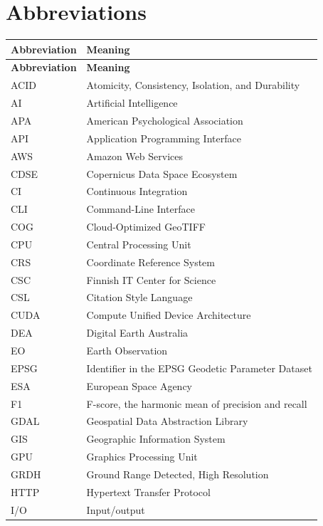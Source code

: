 \chapter*{Abbreviations}


\small
\begin{longtable}{p{}p{}}
\toprule
\textbf{Abbreviation} & \textbf{Meaning} \\
\midrule
\endfirsthead
\toprule
\textbf{Abbreviation} & \textbf{Meaning} \\
\midrule
\endhead
ACID & Atomicity, Consistency, Isolation, and Durability \\
AI & Artificial Intelligence \\
APA & American Psychological Association \\
API & Application Programming Interface \\
AWS & Amazon Web Services \\
CDSE & Copernicus Data Space Ecosystem \\
CI & Continuous Integration \\
CLI & Command-Line Interface \\
COG & Cloud-Optimized GeoTIFF \\
CPU & Central Processing Unit \\
CRS & Coordinate Reference System \\
CSC & Finnish IT Center for Science \\
CSL & Citation Style Language \\
CUDA & Compute Unified Device Architecture \\
DEA & Digital Earth Australia \\
EO & Earth Observation \\
EPSG & Identifier in the EPSG Geodetic Parameter Dataset \\
ESA & European Space Agency \\
F1 & F-score, the harmonic mean of precision and recall \\
GDAL & Geospatial Data Abstraction Library \\
GIS & Geographic Information System \\
GPU & Graphics Processing Unit \\
GRDH & Ground Range Detected, High Resolution \\
HTTP & Hypertext Transfer Protocol \\
I/O & Input/output \\

\end{longtable}
